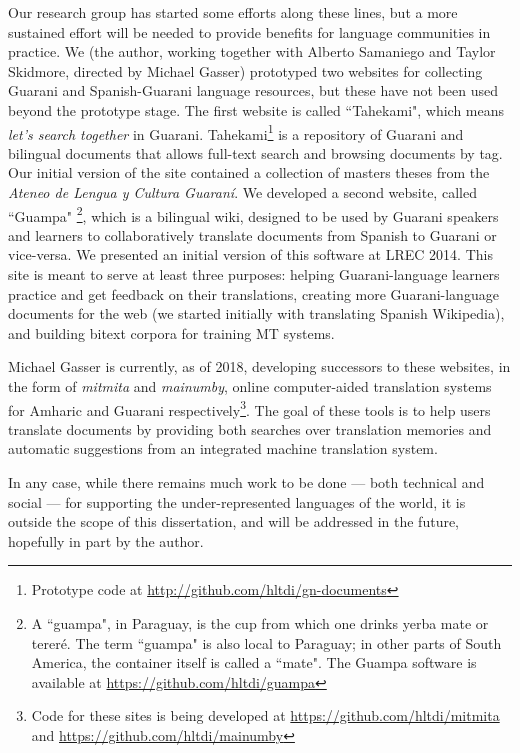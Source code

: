 Our research group has started some efforts along these lines, but a more
sustained effort will be needed to provide benefits for language communities in
practice. We (the author, working together with Alberto Samaniego and Taylor
Skidmore, directed by Michael Gasser) prototyped two websites for collecting
Guarani and Spanish-Guarani language resources, but these have not been used
beyond the prototype stage.  The first website is called ``Tahekami", which
means \emph{let's search together} in Guarani. Tahekami\footnote{Prototype code
at \url{http://github.com/hltdi/gn-documents}} is a repository of Guarani and
bilingual documents that allows full-text search and browsing documents by tag.
Our initial version of the site contained a collection of masters theses from
the \emph{Ateneo de Lengua y Cultura Guaraní}.
We developed a second website, called ``Guampa" \footnote{A ``guampa", in
Paraguay, is the cup from which one drinks yerba mate or tereré. The term
``guampa" is also local to Paraguay; in other parts of South America, the
container itself is called a ``mate". The Guampa software is available at
\url{https://github.com/hltdi/guampa}}, which is a bilingual wiki, designed
to be used by Guarani speakers and learners to collaboratively translate
documents from Spanish to Guarani or vice-versa. We presented an initial version
of this software at LREC 2014\cite{RUDNICK14.151}. This site is meant to serve
at least three purposes: helping Guarani-language learners practice and get
feedback on their translations, creating more Guarani-language documents for
the web (we started initially with translating Spanish Wikipedia), and building
bitext corpora for training MT systems.

Michael Gasser is currently, as of 2018, developing successors to these
websites, in the form of \emph{mitmita} and \emph{mainumby}, online
computer-aided translation systems for Amharic and Guarani
respectively\footnote{Code for these sites is being developed at
\url{https://github.com/hltdi/mitmita} and
\url{https://github.com/hltdi/mainumby}}. The goal of these tools is to help
users translate documents by providing both searches over translation memories
and automatic suggestions from an integrated machine translation system.

In any case, while there remains much work to be done --- both technical and
social --- for supporting the under-represented languages of the world, it is
outside the scope of this dissertation, and will be addressed in the future,
hopefully in part by the author.
